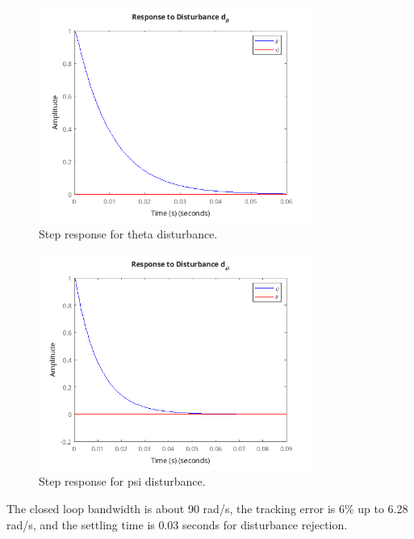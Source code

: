 \documentclass{article}
\begin{document}
\begin{figure}
    \centering
    \includegraphics[width=0.8\textwidth]{stepDtheta.png}
    \caption{Step response for theta disturbance.}
    \label{fig:stepDtheta}
\end{figure}

\begin{figure}
    \centering
    \includegraphics[width=0.8\textwidth]{stepDpsi.png}
    \caption{Step response for psi disturbance.}
    \label{fig:stepDpsi}
\end{figure}

The closed loop bandwidth is about 90 rad/s, the tracking error is 6\% up to 6.28 rad/s, and the settling time is 0.03 seconds for disturbance rejection. 
\end{document}
